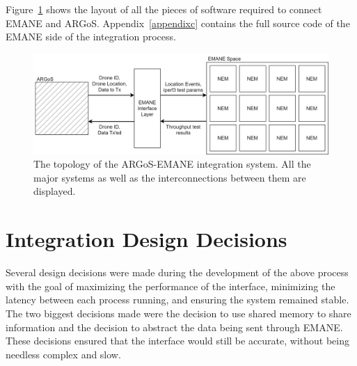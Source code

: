 Figure~\ref{emane_argos} shows the layout of all the pieces of software required to connect EMANE and ARGoS.
Appendix~\ref{appendixc} contains the full source code of the EMANE side of the integration process.
\begin{figure}[!ht]
    \centering
    \includegraphics[width=\textwidth,keepaspectratio]{Images/Chpt5/ARGoS-EMANE.png}
    \caption{The topology of the ARGoS-EMANE integration system. All the major systems as well as the interconnections between them are displayed.}
    \label{emane_argos}
\end{figure}

\section{Integration Design Decisions}
Several design decisions were made during the development of the above process with the goal of maximizing the performance of the interface, minimizing the latency between each process running, and ensuring the system remained stable.
The two biggest decisions made were the decision to use shared memory to share information and the decision to abstract the data being sent through EMANE.
These decisions ensured that the interface would still be accurate, without being needless complex and slow. 


